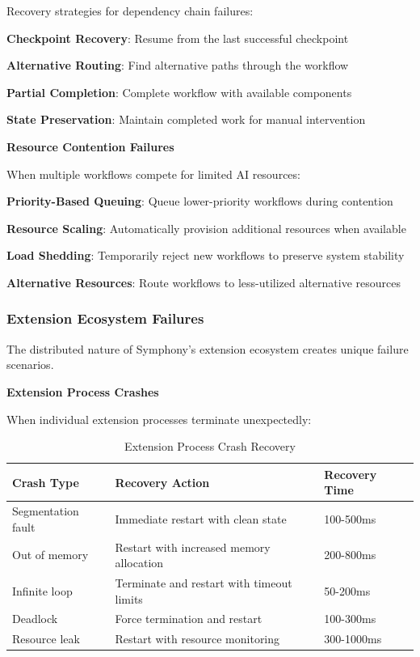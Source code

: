 Recovery strategies for dependency chain failures:

\begin{compactlist}
    \item \textbf{Checkpoint Recovery}: Resume from the last successful checkpoint
    \item \textbf{Alternative Routing}: Find alternative paths through the workflow
    \item \textbf{Partial Completion}: Complete workflow with available components
    \item \textbf{State Preservation}: Maintain completed work for manual intervention
\end{compactlist}

\textbf{Resource Contention Failures}

When multiple workflows compete for limited AI resources:

\begin{compactlist}
    \item \textbf{Priority-Based Queuing}: Queue lower-priority workflows during contention
    \item \textbf{Resource Scaling}: Automatically provision additional resources when available
    \item \textbf{Load Shedding}: Temporarily reject new workflows to preserve system stability
    \item \textbf{Alternative Resources}: Route workflows to less-utilized alternative resources
\end{compactlist}

\subsubsection{Extension Ecosystem Failures}

The distributed nature of Symphony's extension ecosystem creates unique failure scenarios.

\textbf{Extension Process Crashes}

When individual extension processes terminate unexpectedly:

\begin{table}[h]
\centering
\caption{Extension Process Crash Recovery}
\label{tab:process-crash-recovery}
\begin{tabular}{@{}lll@{}}
\toprule
\textbf{Crash Type} & \textbf{Recovery Action} & \textbf{Recovery Time} \\
\midrule
Segmentation fault & Immediate restart with clean state & 100-500ms \\
Out of memory & Restart with increased memory allocation & 200-800ms \\
Infinite loop & Terminate and restart with timeout limits & 50-200ms \\
Deadlock & Force termination and restart & 100-300ms \\
Resource leak & Restart with resource monitoring & 300-1000ms \\
\bottomrule
\end{tabular}
\end{table}

